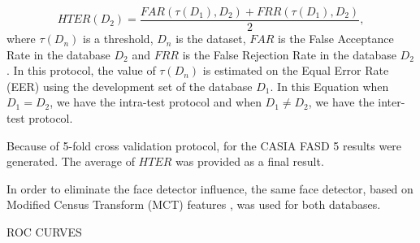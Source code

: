 \begin{equation}
\label{eq:HTER}
HTER(D_2)=\frac{FAR(\tau(D_1),D_2)+ FRR(\tau(D_1),D_2)} {2} ,
\end{equation}
where $\tau(D_n)$ is a threshold, $D_n$ is the dataset, $FAR$ is the False Acceptance Rate in the database $D_2$ and $FRR$ is the False Rejection Rate in the database $D_2$. In this protocol, the value of $\tau(D_n)$ is estimated on the Equal Error Rate (EER) using the development set of the database $D_1$. In this Equation when $D_1 = D_2$, we have the intra-test protocol and when $D_1 \neq D_2$, we have the inter-test protocol.

Because of 5-fold cross validation protocol, for the CASIA FASD 5 results were generated. The average of $HTER$ was provided as a final result.

In order to eliminate the face detector influence, the same face detector, based on Modified Census Transform (MCT) features \cite{froba2004face}, was used for both databases.

ROC CURVES


